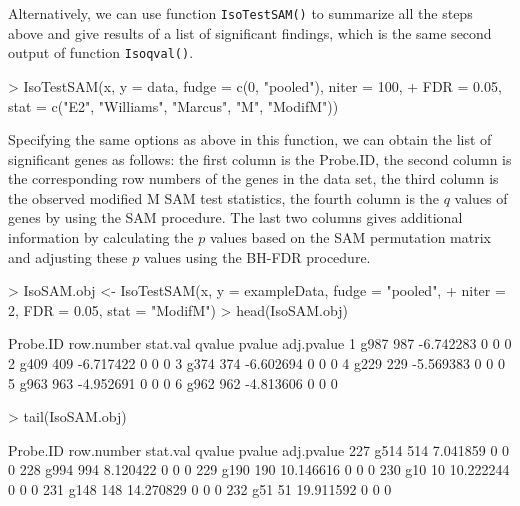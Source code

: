 \documentclass[10pt]{mybook4}
\begin{document}
Alternatively, we can use function \texttt{IsoTestSAM()} to summarize all the steps above and give results of a list of significant findings, which is the same second output of function \texttt{Isoqval()}.

\begin{Schunk}
\begin{Sinput}
> IsoTestSAM(x, y = data, fudge = c(0, "pooled"), niter = 100, 
+     FDR = 0.05, stat = c("E2", "Williams", "Marcus", "M", "ModifM"))
\end{Sinput}
\end{Schunk}

Specifying the same options as above in this function, we can obtain the list of significant genes as follows: the first column is the Probe.ID, the second column is the corresponding row numbers of the genes in the data set, the third column is the observed modified M SAM test statistics, the fourth column is the $q$ values of genes by using the SAM procedure. The last two columns gives additional information by calculating the $p$ values based on the SAM permutation matrix and adjusting these $p$ values using the BH-FDR procedure.

\begin{Schunk}
\begin{Sinput}
> IsoSAM.obj <- IsoTestSAM(x, y = exampleData, fudge = "pooled", 
+     niter = 2, FDR = 0.05, stat = "ModifM")
> head(IsoSAM.obj)
\end{Sinput}
\begin{Soutput}
  Probe.ID row.number  stat.val qvalue pvalue adj.pvalue
1     g987        987 -6.742283      0      0          0
2     g409        409 -6.717422      0      0          0
3     g374        374 -6.602694      0      0          0
4     g229        229 -5.569383      0      0          0
5     g963        963 -4.952691      0      0          0
6     g962        962 -4.813606      0      0          0
\end{Soutput}
\begin{Sinput}
> tail(IsoSAM.obj)
\end{Sinput}
\begin{Soutput}
    Probe.ID row.number  stat.val qvalue pvalue adj.pvalue
227     g514        514  7.041859      0      0          0
228     g994        994  8.120422      0      0          0
229     g190        190 10.146616      0      0          0
230      g10         10 10.222244      0      0          0
231     g148        148 14.270829      0      0          0
232      g51         51 19.911592      0      0          0
\end{Soutput}
\end{Schunk}
\end{document}
